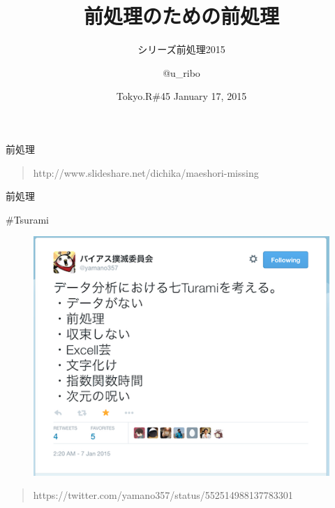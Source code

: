 \documentclass[17pt,ignorenonframetext,]{beamer}
\title{前処理のための前処理}
\subtitle{シリーズ前処理2015}
\author{@u\_ribo}
\date{Tokyo.R\#45 January 17, 2015}
\begin{document}
\frame{\titlepage}

\begin{frame}


\end{frame}

\begin{frame}{前処理 \faFood}


\begin{quote}
\scriptsize{http://www.slideshare.net/dichika/maeshori-missing}
\end{quote}

\end{frame}

\begin{frame}{前処理 \faFood}


\end{frame}

\begin{frame}{\#Tsurami}

\begin{figure}
  \includegraphics[scale = 0.8]{images/tsurami.png}
\end{figure}

\begin{quote}
\scriptsize{https://twitter.com/yamano357/status/552514988137783301}
\end{quote}

\end{frame}
\end{document}
